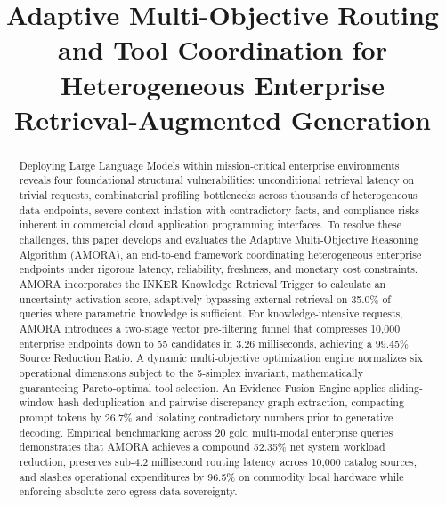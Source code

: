 \documentclass[conference,onecolumn,10pt]{IEEEtran}
\begin{document}
\title{Adaptive Multi-Objective Routing and Tool Coordination for Heterogeneous Enterprise Retrieval-Augmented Generation}

\author{
}

\maketitle

\begin{abstract}
Deploying Large Language Models within mission-critical enterprise environments reveals four foundational structural vulnerabilities: unconditional retrieval latency on trivial requests, combinatorial profiling bottlenecks across thousands of heterogeneous data endpoints, severe context inflation with contradictory facts, and compliance risks inherent in commercial cloud application programming interfaces. To resolve these challenges, this paper develops and evaluates the Adaptive Multi-Objective Reasoning Algorithm (AMORA), an end-to-end framework coordinating heterogeneous enterprise endpoints under rigorous latency, reliability, freshness, and monetary cost constraints. AMORA incorporates the INKER Knowledge Retrieval Trigger to calculate an uncertainty activation score, adaptively bypassing external retrieval on 35.0\% of queries where parametric knowledge is sufficient. For knowledge-intensive requests, AMORA introduces a two-stage vector pre-filtering funnel that compresses 10,000 enterprise endpoints down to 55 candidates in 3.26 milliseconds, achieving a 99.45\% Source Reduction Ratio. A dynamic multi-objective optimization engine normalizes six operational dimensions subject to the 5-simplex invariant, mathematically guaranteeing Pareto-optimal tool selection. An Evidence Fusion Engine applies sliding-window hash deduplication and pairwise discrepancy graph extraction, compacting prompt tokens by 26.7\% and isolating contradictory numbers prior to generative decoding. Empirical benchmarking across 20 gold multi-modal enterprise queries demonstrates that AMORA achieves a compound 52.35\% net system workload reduction, preserves sub-4.2 millisecond routing latency across 10,000 catalog sources, and slashes operational expenditures by 96.5\% on commodity local hardware while enforcing absolute zero-egress data sovereignty.
\end{abstract}
\end{document}
